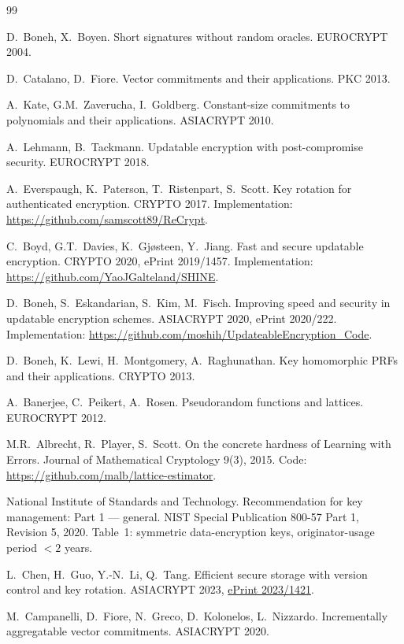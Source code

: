 \begin{thebibliography}{99}

D.~Boneh, X.~Boyen.
Short signatures without random oracles.
EUROCRYPT 2004.

D.~Catalano, D.~Fiore.
Vector commitments and their applications.
PKC 2013.

A.~Kate, G.M.~Zaverucha, I.~Goldberg.
Constant-size commitments to polynomials and their applications.
ASIACRYPT 2010.

A.~Lehmann, B.~Tackmann.
Updatable encryption with post-compromise security.
EUROCRYPT 2018.

A.~Everspaugh, K.~Paterson, T.~Ristenpart, S.~Scott.
Key rotation for authenticated encryption.
CRYPTO 2017.
Implementation: \url{https://github.com/samscott89/ReCrypt}.

C.~Boyd, G.T.~Davies, K.~Gjøsteen, Y.~Jiang.
Fast and secure updatable encryption.
CRYPTO 2020, ePrint 2019/1457.
Implementation: \url{https://github.com/YaoJGalteland/SHINE}.

D.~Boneh, S.~Eskandarian, S.~Kim, M.~Fisch.
Improving speed and security in updatable encryption schemes.
ASIACRYPT 2020, ePrint 2020/222.
Implementation: \url{https://github.com/moshih/UpdateableEncryption_Code}.

D.~Boneh, K.~Lewi, H.~Montgomery, A.~Raghunathan.
Key homomorphic PRFs and their applications.
CRYPTO 2013.

A.~Banerjee, C.~Peikert, A.~Rosen.
Pseudorandom functions and lattices.
EUROCRYPT 2012.

M.R.~Albrecht, R.~Player, S.~Scott.
On the concrete hardness of Learning with Errors.
Journal of Mathematical Cryptology 9(3), 2015.
Code: \url{https://github.com/malb/lattice-estimator}.

National Institute of Standards and Technology.
Recommendation for key management: Part 1 --- general.
NIST Special Publication 800-57 Part 1, Revision 5, 2020.
Table~1: symmetric data-encryption keys, originator-usage period ${}<2$ years.

L.~Chen, H.~Guo, Y.-N.~Li, Q.~Tang.
Efficient secure storage with version control and key rotation.
ASIACRYPT 2023, \href{https://eprint.iacr.org/2023/1421}{ePrint 2023/1421}.

M.~Campanelli, D.~Fiore, N.~Greco, D.~Kolonelos, L.~Nizzardo.
Incrementally aggregatable vector commitments.
ASIACRYPT 2020.


\end{thebibliography}
